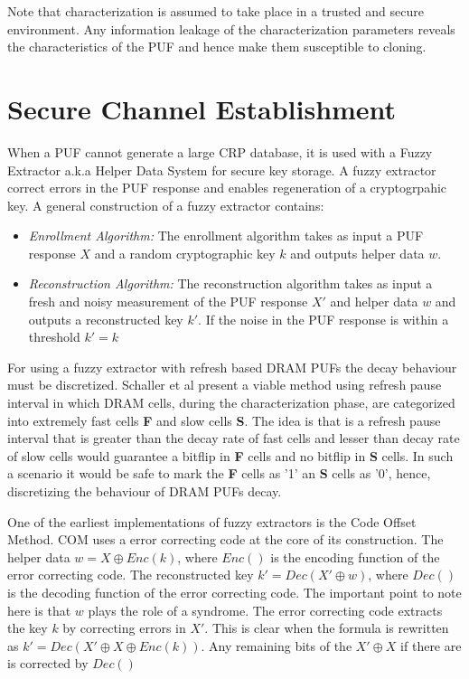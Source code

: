 \documentclass[journal, a4paper]{IEEEtran}
\begin{document}
Note that characterization is assumed to take place in a trusted and secure environment. Any information leakage of the characterization parameters reveals the characteristics of the PUF and hence make them susceptible to cloning.

\section{Secure Channel Establishment}

When a PUF cannot generate a large CRP database, it is used with a Fuzzy Extractor a.k.a Helper Data System \cite{HDS15} for secure key storage. A fuzzy extractor correct errors in the PUF response \cite{SUT18} and enables regeneration of a cryptogrpahic key. A general construction of a fuzzy extractor contains:

\begin{itemize}
    \item \textit{Enrollment Algorithm:} The enrollment algorithm takes as input a PUF response \(X\) and a random cryptographic key \(k\) and outputs helper data \(w\).
    \item \textit{Reconstruction Algorithm:}  The reconstruction algorithm takes as input a fresh and noisy measurement of the PUF response \(X'\) and helper data \(w\) and outputs a reconstructed key \(k'\). If the noise in the PUF response is within a threshold \( k' = k\)
\end{itemize}

For using a fuzzy extractor with refresh based DRAM PUFs the decay behaviour must be discretized. Schaller et al present a viable method using refresh pause interval in which DRAM cells, during the characterization phase, are categorized into extremely fast cells \textbf{F} and slow cells \textbf{S}. The idea is that is a refresh pause interval that is greater than the decay rate of fast cells and lesser than decay rate of slow cells would guarantee a bitflip in \textbf{F} cells and no bitflip in \textbf{S} cells. In such a scenario it would be safe to mark the \textbf{F} cells as '1' an \textbf{S} cells as '0', hence, discretizing the behaviour of DRAM PUFs decay.

One of the earliest implementations of fuzzy extractors is the Code Offset Method. \cite{COM} COM uses a error correcting code at the core of its construction. The helper data \(w = X \oplus Enc(k)\), where \(Enc()\) is the encoding function of the error correcting code. The reconstructed key \(k' = Dec(X' \oplus w)\), where \(Dec()\) is the decoding function of the error correcting code. The important point to note here is that \(w\) plays the role of a syndrome. The error correcting code extracts the key \(k\) by correcting errors in \(X'\). This is clear when the formula is rewritten as \(k' = Dec(X' \oplus X \oplus Enc(k))\). Any remaining bits of the \(X' \oplus X\) if there are is corrected by \(Dec()\)
\end{document}
